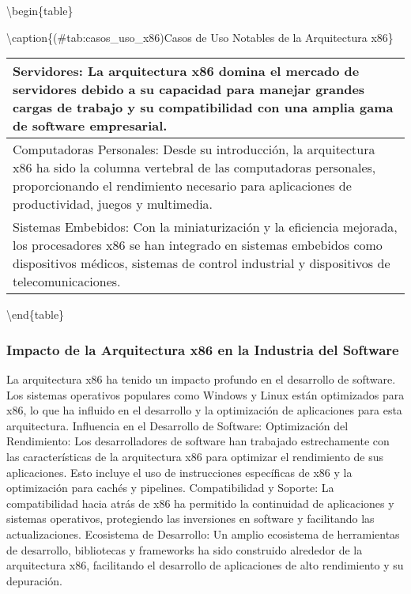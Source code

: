 \documentclass[12pt,twoside]{templates/unerthesis}
\begin{document}
\textbackslash{}begin\{table\}

\textbackslash{}caption\{(\#tab:casos\_uso\_x86)Casos de Uso Notables de la Arquitectura x86\}
\centering

\begin{tabular}[t]{l}
\hline
Servidores: La arquitectura x86 domina el mercado de servidores debido a su capacidad para manejar grandes cargas de trabajo y su compatibilidad con una amplia gama de software empresarial.\\
\hline
Computadoras Personales: Desde su introducción, la arquitectura x86 ha sido la columna vertebral de las computadoras personales, proporcionando el rendimiento necesario para aplicaciones de productividad, juegos y multimedia.\\
\hline
Sistemas Embebidos: Con la miniaturización y la eficiencia mejorada, los procesadores x86 se han integrado en sistemas embebidos como dispositivos médicos, sistemas de control industrial y dispositivos de telecomunicaciones.\\
\hline
\end{tabular}

\textbackslash{}end\{table\}

\hypertarget{impacto-de-la-arquitectura-x86-en-la-industria-del-software}{%
\subsubsection{Impacto de la Arquitectura x86 en la Industria del Software}\label{impacto-de-la-arquitectura-x86-en-la-industria-del-software}}

La arquitectura x86 ha tenido un impacto profundo en el desarrollo de software. Los sistemas operativos populares como Windows y Linux están optimizados para x86, lo que ha influido en el desarrollo y la optimización de aplicaciones para esta arquitectura.
Influencia en el Desarrollo de Software:
Optimización del Rendimiento: Los desarrolladores de software han trabajado estrechamente con las características de la arquitectura x86 para optimizar el rendimiento de sus aplicaciones. Esto incluye el uso de instrucciones específicas de x86 y la optimización para cachés y pipelines.
Compatibilidad y Soporte: La compatibilidad hacia atrás de x86 ha permitido la continuidad de aplicaciones y sistemas operativos, protegiendo las inversiones en software y facilitando las actualizaciones.
Ecosistema de Desarrollo: Un amplio ecosistema de herramientas de desarrollo, bibliotecas y frameworks ha sido construido alrededor de la arquitectura x86, facilitando el desarrollo de aplicaciones de alto rendimiento y su depuración.
\end{document}
